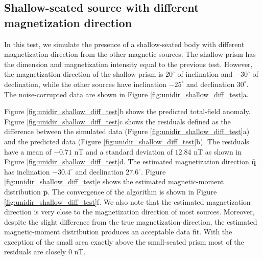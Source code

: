 \subsection{Shallow-seated source with different magnetization direction}

In this test, we simulate the presence of a shallow-seated body with different 
magnetization direction from the other magnetic sources. The shallow prism has the dimension 
and magnetization intensity equal to the previous test. However, the magnetization direction 
of the shallow prism is $20^\circ$ of inclination and $-30^\circ$ of declination, while the 
other sources have inclination $-25^\circ$ and declination $30^\circ$. The noise-corrupted 
data are shown in Figure \ref{fig:unidir_shallow_diff_test}a.

Figure \ref{fig:unidir_shallow_diff_test}b shows the predicted total-field anomaly. 
Figure \ref{fig:unidir_shallow_diff_test}c shows the residuals defined as the difference 
between the simulated data (Figure \ref{fig:unidir_shallow_diff_test}a) and the predicted 
data (Figure \ref{fig:unidir_shallow_diff_test}b). The residuals have a mean of $-0.71$ nT 
and a standard deviation of $12.84$ nT as shown in Figure \ref{fig:unidir_shallow_diff_test}d. 
The estimated magnetization direction $\bar{\mathbf{q}}$ has inclination $-30.4^\circ$ 
and declination $27.6^\circ$. Figure \ref{fig:unidir_shallow_diff_test}e shows the estimated 
magnetic-moment distribution $\bar{\mathbf{p}}$. The convergence of the algorithm is shown 
in Figure \ref{fig:unidir_shallow_diff_test}f. We also note that the estimated magnetization 
direction is very close to the magnetization direction of most sources. Moreover, despite the 
slight difference from the true magnetization direction, the estimated magnetic-moment 
distribution produces an acceptable data fit. With the exception of the small area exactly 
above the small-seated prism most of the residuals are closely $0$ nT.  

